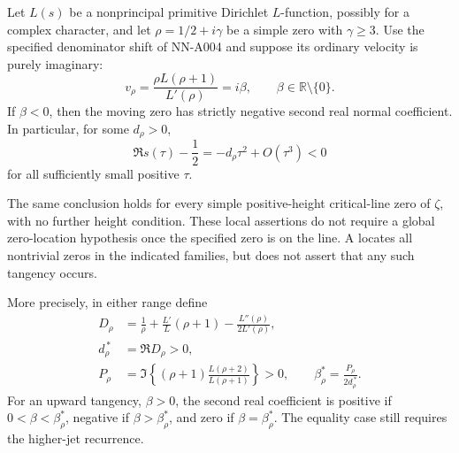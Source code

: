 \begin{theorem}
\label{thm:A044-downward}
Let $L(s)$ be a nonprincipal primitive Dirichlet $L$-function,
possibly for a complex character, and let
$\rho=1/2+i\gamma$ be a simple zero with $\gamma\ge3$.
Use the specified denominator shift of NN-A004 and suppose its
ordinary velocity is purely imaginary:
\[
                   v_\rho=
             \frac{\rho L(\rho+1)}{L'(\rho)}=i\beta,
                  \qquad \beta\in\mathbb R\setminus\{0\}.
\]
If $\beta<0$, then the moving zero has strictly negative second
real normal coefficient. In particular, for some $d_\rho>0$,
\[
          \Re s(\tau)-\frac12=-d_\rho\tau^2+O(\tau^3)<0
\]
for all sufficiently small positive $\tau$.

The same conclusion holds for every simple positive-height
critical-line zero of $\zeta$, with no further height condition.
These local assertions do not require a global zero-location
hypothesis once the specified zero is on the line. A locates
all nontrivial zeros in the indicated families, but does not
assert that any such tangency occurs.

More precisely, in either range define
\[
 \begin{aligned}
 D_\rho&=\frac1\rho+\frac{L'}L(\rho+1)
                                  -\frac{L''(\rho)}{2L'(\rho)},\\
 d_\rho^{\,*}&=\Re D_\rho>0,\\
 P_\rho&=\Im\left\{(\rho+1)\frac{L(\rho+2)}{L(\rho+1)}\right\}>0,
       \qquad \beta_\rho^*=\frac{P_\rho}{2d_\rho^{\,*}}.
 \end{aligned}
\]
For an upward tangency, $\beta>0$, the second real coefficient
is positive if $0<\beta<\beta_\rho^*$, negative if
$\beta>\beta_\rho^*$, and zero if $\beta=\beta_\rho^*$.
The equality case still requires the higher-jet recurrence.
\end{theorem}

